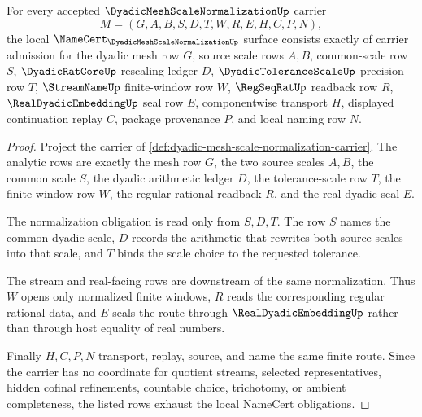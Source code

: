 \begin{theorem}
\label{thm:dyadic-mesh-scale-normalization-namecert-obligations}
For every accepted $\DyadicMeshScaleNormalizationUp$ carrier
$$
M=(G,A,B,S,D,T,W,R,E,H,C,P,N),
$$
the local $\NameCert_{\DyadicMeshScaleNormalizationUp}$ surface consists exactly of carrier admission for the dyadic mesh row $G$, source scale rows $A,B$, common-scale row $S$, $\DyadicRatCoreUp$ rescaling ledger $D$, $\DyadicToleranceScaleUp$ precision row $T$, $\StreamNameUp$ finite-window row $W$, $\RegSeqRatUp$ readback row $R$, $\RealDyadicEmbeddingUp$ seal row $E$, componentwise transport $H$, displayed continuation replay $C$, package provenance $P$, and local naming row $N$.
\end{theorem}
\begin{proof}
Project the carrier of \autoref{def:dyadic-mesh-scale-normalization-carrier}. The analytic rows are exactly the mesh row $G$, the two source scales $A,B$, the common scale $S$, the dyadic arithmetic ledger $D$, the tolerance-scale row $T$, the finite-window row $W$, the regular rational readback $R$, and the real-dyadic seal $E$.

The normalization obligation is read only from $S,D,T$. The row $S$ names the common dyadic scale, $D$ records the arithmetic that rewrites both source scales into that scale, and $T$ binds the scale choice to the requested tolerance.

The stream and real-facing rows are downstream of the same normalization. Thus $W$ opens only normalized finite windows, $R$ reads the corresponding regular rational data, and $E$ seals the route through $\RealDyadicEmbeddingUp$ rather than through host equality of real numbers.

Finally $H,C,P,N$ transport, replay, source, and name the same finite route. Since the carrier has no coordinate for quotient streams, selected representatives, hidden cofinal refinements, countable choice, trichotomy, or ambient completeness, the listed rows exhaust the local NameCert obligations.
\end{proof}

